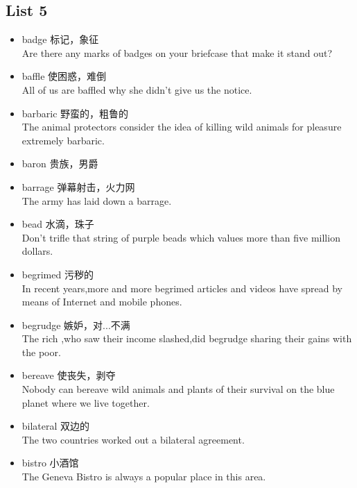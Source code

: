 \documentclass[a4paper,10pt]{article}
\begin{document}
\begin{CJK*}{UTF8}{gkai}
\newpage
\section{List 5}
\begin{itemize}
\item badge 标记，象征 \\
\hspace{1cm}Are there any marks of badges on your briefcase that make it stand out?
\item baffle 使困惑，难倒\\
\hspace{1cm}All of us are baffled why she didn't give us the notice.
\item barbaric 野蛮的，粗鲁的\\
\hspace{1cm}The animal protectors consider the idea of killing wild animals for pleasure extremely barbaric.
\item baron 贵族，男爵\\
\hspace{1cm}
\item barrage 弹幕射击，火力网\\
\hspace{1cm}The army has laid down a barrage.
\item bead 水滴，珠子\\
\hspace{1cm}Don't trifle that string of purple beads which values more than five million dollars.
\item begrimed 污秽的\\
\hspace{1cm}In recent years,more and more begrimed articles and videos have spread by means of Internet and mobile phones.
\item begrudge 嫉妒，对...不满\\
\hspace{1cm}The rich ,who saw their income slashed,did begrudge sharing their gains with the poor.
\item bereave 使丧失，剥夺\\
\hspace{1cm}Nobody can bereave wild animals and plants of their survival on the blue planet where we live together.
\item bilateral 双边的\\
\hspace{1cm}The two countries worked out a bilateral agreement.
\item bistro 小酒馆\\
\hspace{1cm}The Geneva Bistro is always a popular place in this area.
\end{itemize}


\end{CJK*}
\end{document}
